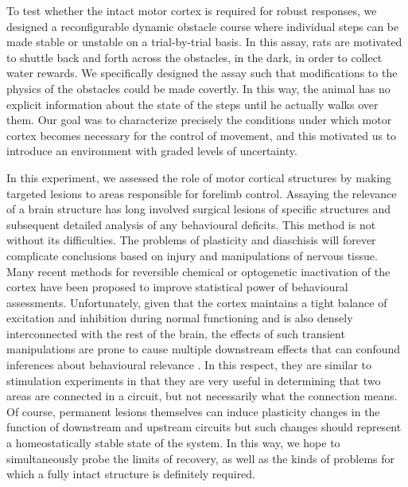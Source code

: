 To test whether the intact motor cortex is required for robust responses, we designed a reconfigurable dynamic obstacle course where individual steps can be made stable or unstable on a trial-by-trial basis. In this assay, rats are motivated to shuttle back and forth across the obstacles, in the dark, in order to collect water rewards. We specifically designed the assay such that modifications to the physics of the obstacles could be made covertly. In this way, the animal has no explicit information about the state of the steps until he actually walks over them. Our goal was to characterize precisely the conditions under which motor cortex becomes necessary for the control of movement, and this motivated us to introduce an environment with graded levels of uncertainty.

In this experiment, we assessed the role of motor cortical structures by making targeted lesions to areas responsible for forelimb control. Assaying the relevance of a brain structure has long involved surgical lesions of specific structures and subsequent detailed analysis of any behavioural deficits. This method is not without its difficulties. The problems of plasticity and diaschisis will forever complicate conclusions based on injury and manipulations of nervous tissue. Many recent methods for reversible chemical or optogenetic inactivation of the cortex have been proposed to improve statistical power of behavioural assessments. Unfortunately, given that the cortex maintains a tight balance of excitation and inhibition during normal functioning and is also densely interconnected with the rest of the brain, the effects of such transient manipulations are prone to cause multiple downstream effects that can confound inferences about behavioural relevance \cite{Otchy2015}. In this respect, they are similar to stimulation experiments in that they are very useful in determining that two areas are connected in a circuit, but not necessarily what the connection means. Of course, permanent lesions themselves can induce plasticity changes in the function of downstream and upstream circuits but such changes should represent a homeostatically stable state of the system. In this way, we hope to simultaneously probe the limits of recovery, as well as the kinds of problems for which a fully intact structure is definitely required.
